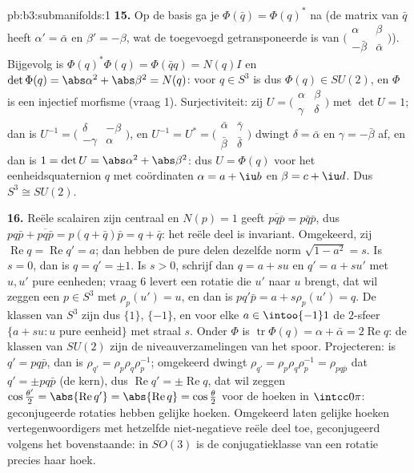 \begin{solution}{pb:b3:submanifolds:1}
\textbf{15.} Op de basis ga je $\Phi(\bar q) = \Phi(q)^*$ na (de
matrix van $\bar q$ heeft $\alpha' = \bar\alpha$ en $\beta' =
-\beta$, wat de toegevoegd getransponeerde is van
$\bigl(\begin{smallmatrix}\alpha & \beta\\ -\bar\beta &
\bar\alpha\end{smallmatrix}\bigr)$). Bijgevolg is
$\Phi(q)^*\Phi(q) = \Phi(\bar qq) = N(q)I$ en $\det\Phi(q) =
\abs\alpha^2 + \abs\beta^2 = N(q)$: voor $q \in S^3$ is dus
$\Phi(q) \in SU(2)$, en $\Phi$ is een injectief morfisme (vraag
1). Surjectiviteit: zij $U = \bigl(\begin{smallmatrix}\alpha &
\beta\\ \gamma & \delta\end{smallmatrix}\bigr)$ met $\det U = 1$;
dan is $U^{-1} = \bigl(\begin{smallmatrix}\delta & -\beta\\
-\gamma & \alpha\end{smallmatrix}\bigr)$, en $U^{-1} = U^* =
\bigl(\begin{smallmatrix}\bar\alpha & \bar\gamma\\ \bar\beta &
\bar\delta\end{smallmatrix}\bigr)$ dwingt $\delta = \bar\alpha$
en $\gamma = -\bar\beta$ af, en dan is $1 = \det U =
\abs\alpha^2 + \abs\beta^2$: dus $U = \Phi(q)$ voor het
eenheidsquaternion $q$ met coördinaten $\alpha = a + \iu b$ en
$\beta = c + \iu d$. Dus $S^3 \cong SU(2)$.

\textbf{16.} Reële scalairen zijn centraal en $N(p) = 1$ geeft
$\overline{pq\bar p} = p\bar q\bar p$, dus $pq\bar p +
\overline{pq\bar p} = p(q + \bar q)\bar p = q + \bar q$: het
reële deel is invariant. Omgekeerd, zij $\operatorname{Re}q =
\operatorname{Re}q' = a$; dan hebben de pure delen dezelfde norm
$\sqrt{1 - a^2} = s$. Is $s = 0$, dan is $q = q' = \pm1$. Is $s >
0$, schrijf dan $q = a + su$ en $q' = a + su'$ met $u, u'$ pure
eenheden; vraag 6 levert een rotatie die $u'$ naar $u$ brengt,
dat wil zeggen een $p \in S^3$ met $\rho_p(u') = u$, en dan is
$pq'\bar p = a + s\rho_p(u') = q$. De klassen van $S^3$ zijn dus
$\{1\}$, $\{-1\}$, en voor elke $a \in \intoo{-1}1$ de $2$-sfeer
$\{a + su : u \text{ pure eenheid}\}$ met straal $s$. Onder
$\Phi$ is $\operatorname{tr}\Phi(q) = \alpha + \bar\alpha =
2\operatorname{Re}q$: de klassen van $SU(2)$ zijn de
niveauverzamelingen van het spoor. Projecteren: is $q' = pq\bar
p$, dan is $\rho_{q'} = \rho_p\rho_q\rho_p^{-1}$; omgekeerd
dwingt $\rho_{q'} = \rho_p\rho_q\rho_p^{-1} = \rho_{pq\bar p}$
dat $q' = \pm pq\bar p$ (de kern), dus $\operatorname{Re}q' =
\pm\operatorname{Re}q$, dat wil zeggen $\cos\frac{\theta'}2 =
\abs{\operatorname{Re}q'} = \abs{\operatorname{Re}q} =
\cos\frac\theta2$ voor de hoeken in $\intcc0\pi$: geconjugeerde
rotaties hebben gelijke hoeken. Omgekeerd laten gelijke hoeken
vertegenwoordigers met hetzelfde niet-negatieve reële deel toe,
geconjugeerd volgens het bovenstaande: in $SO(3)$ is de
conjugatieklasse van een rotatie precies haar hoek.


\end{solution}
